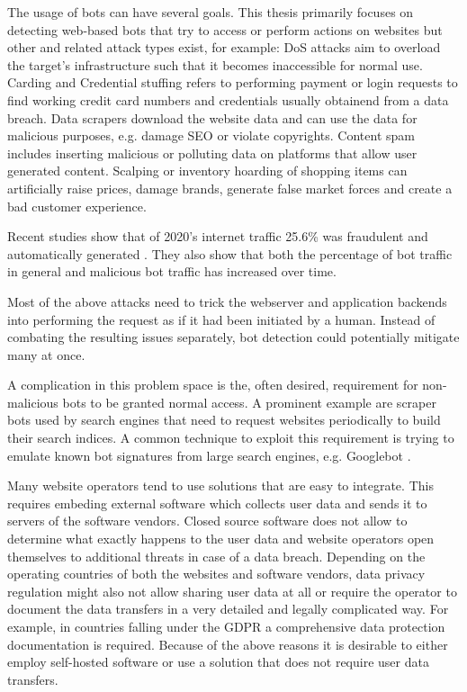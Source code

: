\documentclass[
    fontsize=12pt,
    headings=small,
    parskip=half,           %
    bibliography=totoc,
    numbers=noenddot,       %
    open=any,               %
    final                   %
]{scrreprt}
\begin{document}
The usage of bots can have several goals. This thesis primarily focuses on detecting web-based bots that try to access or perform actions on websites but other and related attack types exist, for example:
DoS attacks aim to overload the target's infrastructure such that it becomes inaccessible for normal use. Carding and Credential stuffing refers to performing payment or login requests to find working credit card numbers and credentials usually obtainend from a data breach. Data scrapers download the website data and can use the data for malicious purposes, e.g. damage SEO or violate copyrights. Content spam includes inserting malicious or polluting data on platforms that allow user generated content. Scalping or inventory hoarding of shopping items can artificially raise prices, damage brands, generate false market forces and create a bad customer experience.

Recent studies show that of 2020's internet traffic 25.6\% was fraudulent and automatically generated \cite{BAD_BOT_REPORT2020} \cite{BAD_BOT_REPORT2021}. They also show that both the percentage of bot traffic in general and malicious bot traffic has increased over time.

Most of the above attacks need to trick the webserver and application backends into performing the request as if it had been initiated by a human. Instead of combating the resulting issues separately, bot detection could potentially mitigate many at once.

A complication in this problem space is the, often desired, requirement for non-malicious bots to be granted normal access. A prominent example are scraper bots used by search engines that need to request websites periodically to build their search indices. A common technique to exploit this requirement is trying to emulate known bot signatures from large search engines, e.g. Googlebot \cite{8421894}.

Many website operators tend to use solutions that are easy to integrate. This requires embeding external software which collects user data and sends it to servers of the software vendors. Closed source software does not allow to determine what exactly happens to the user data and website operators open themselves to additional threats in case of a data breach. Depending on the operating countries of both the websites and software vendors, data privacy regulation might also not allow sharing user data at all or require the operator to document the data transfers in a very detailed and legally complicated way. For example, in countries falling under the GDPR \cite{GDPR} a comprehensive data protection documentation is required. Because of the above reasons it is desirable to either employ self-hosted software or use a solution that does not require user data transfers.
\end{document}
